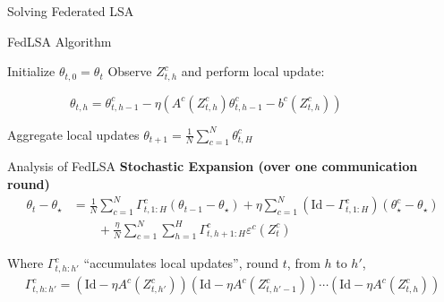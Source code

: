 \documentclass[aspectratio=169,14pt]{beamer}
\begin{document}
\begin{frame}
  \begin{center}
    \textcolor{beamer@blendedblue}{
      \huge Solving Federated LSA
    }
  \end{center}
\end{frame}



\begin{frame}{FedLSA Algorithm}
  \begin{algorithmic}
    \State Initialize $\theta_{t,0} = \theta_t$
    \State Observe $Z^c_{t,h}$ and perform local update:
    \begin{center}
      ~~~~~~~~~~$\theta_{t,h} = \theta_{t,h-1}^c - \eta( A^c(Z^c_{t,h}) \theta_{t,h-1}^c - b^c(Z^c_{t,h}))$
    \end{center}
    \EndFor
    \EndFor
    \State Aggregate local updates $\theta_{t+1} = \tfrac{1}{N} \sum\nolimits_{c=1}^{N} \theta_{t,H}^c $
    \EndFor
  \end{algorithmic}  
\end{frame}


\begin{frame}{Analysis of FedLSA}
  \textbf{Stochastic Expansion (over one communication round)}
  \begin{align*}
    \theta_{t} - \theta_\star
    & =
    \frac{1}{N} \sum_{c=1}^N \Gamma_{t,1:H}^c (\theta_{t-1} - \theta_\star)
    + \eta \sum_{c=1}^N (\text{Id} - \Gamma_{t,1:H}^c) (\theta_\star^c - \theta_\star)
    \\
    & \qquad + \frac{\eta}{N} \sum_{c=1}^N \sum_{h=1}^H \Gamma_{t,h+1:H}^c \varepsilon^c(Z_t^c)
  \end{align*}

  Where $\Gamma_{t,h:h'}^c$ ``accumulates local updates'', round $t$, from $h$ to $h'$,
  \begin{align*}
    \Gamma_{t,h:h'}^c = (\text{Id} - \eta A^c(Z^c_{t,h'})) (\text{Id} - \eta A^c(Z^c_{t,h'-1})) \cdots (\text{Id} - \eta A^c(Z^c_{t,h}))
  \end{align*}  
\end{frame}
\end{document}
